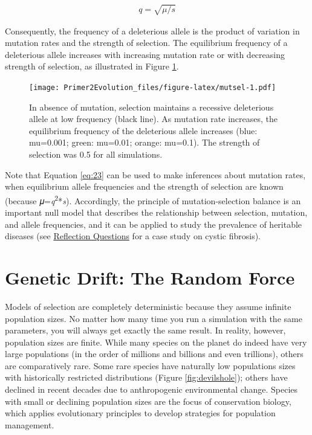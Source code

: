 \documentclass[
]{book}
\begin{document}
\begin{align} 
q=\sqrt{𝜇/s} \label{eq:23}
\end{align}

Consequently, the frequency of a deleterious allele is the product of variation in mutation rates and the strength of selection. The equilibrium frequency of a deleterious allele increases with increasing mutation rate or with decreasing strength of selection, as illustrated in Figure \ref{fig:mutsel}.

\begin{figure}
\centering
\texttt{[image: Primer2Evolution\_files/figure-latex/mutsel-1.pdf]}
\caption{\label{fig:mutsel}In absence of mutation, selection maintains a recessive deleterious allele at low frequency (black line). As mutation rate increases, the equilibrium frequency of the deleterious allele increases (blue: mu=0.001; green: mu=0.01; orange: mu=0.1). The strength of selection was 0.5 for all simulations.}
\end{figure}

Note that Equation \eqref{eq:23} can be used to make inferences about mutation rates, when equilibrium allele frequencies and the strength of selection are known (because 𝜇=\emph{q}\textsuperscript{2}*\emph{s}). Accordingly, the principle of mutation-selection balance is an important null model that describes the relationship between selection, mutation, and allele frequencies, and it can be applied to study the prevalence of heritable diseases (see \href{evolutionary-mechanisms-ii-mutation-genetic-drift-migration-and-non-random-mating.html\#reflection-questions}{Reflection Questions} for a case study on cystic fibrosis).

\hypertarget{genetic-drift-the-random-force}{%
\section{Genetic Drift: The Random Force}\label{genetic-drift-the-random-force}}

Models of selection are completely deterministic because they assume infinite population sizes. No matter how many time you run a simulation with the same parameters, you will always get exactly the same result. In reality, however, population sizes are finite. While many species on the planet do indeed have very large populations (in the order of millions and billions and even trillions), others are comparatively rare. Some rare species have naturally low populations sizes with historically restricted distributions (Figure \ref{fig:devilshole}); others have declined in recent decades due to anthropogenic environmental change. Species with small or declining population sizes are the focus of conservation biology, which applies evolutionary principles to develop strategies for population management.
\end{document}
